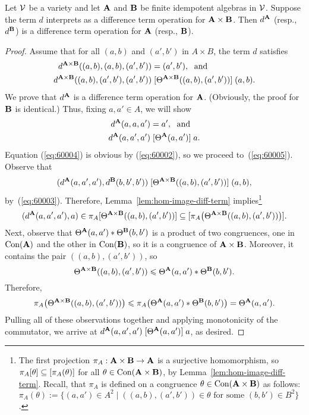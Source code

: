 \begin{lem}
  \label{lem:products}
  Let $\mathcal{V}$ be a variety and let $\mathbf{A}$ and $\mathbf{B}$ be finite idempotent
  algebras in $\mathcal{V}$. Suppose the term $d$ 
  interprets as a difference term operation for $\mathbf{A}\times \mathbf{B}$.
  Then $d^{\mathbf{A}}$ (resp., $d^{\mathbf{B}}$) is a difference term operation for 
  $\mathbf{A}$  (resp., $\mathbf{B}$).
\end{lem}
\begin{proof}
  Assume that for all $(a, b)$ and $(a', b')$ in $A \times B$, the term $d$ satisfies
  \begin{align}
    d^{\bA \times \bB}((a, b), (a, b), (a', b')) &= (a', b'),\; \text{ and } \label{eq:60002}\\
    d^{\bA \times \bB}((a, b), (a', b'), (a', b'))
    &\Comr{\Cg^{\bA \times \bB}((a, b), (a', b'))} (a, b). \label{eq:60003}
  \end{align}
  We prove that $d^{\mathbf{A}}$ is a difference term operation
  for $\mathbf{A}$. (Obviously, the proof for $\mathbf{B}$ is identical.)
  Thus, fixing $a, a' \in A$, we will show 
  \begin{align}
    d^{\bA}(a, a, a') &= a',\; \text{ and } \label{eq:60004}\\
    d^{\bA}(a,a',a')
    &\Comr{\Cg^{\bA}(a, a')} a. \label{eq:60005}
  \end{align}
  Equation (\ref{eq:60004}) is obvious by (\ref{eq:60002}),
  so we proceed to~(\ref{eq:60005}).
  Observe that 
  \[
  (d^{\mathbf{A}}(a, a',a'), d^{\mathbf{B}}(b, b',b'))
  \mathrel{[\Theta^{\mathbf{A} \times \mathbf{B}}((a, b), (a', b'))]} (a, b),
  \]
  by~(\ref{eq:60003}). Therefore, Lemma~\ref{lem:hom-image-diff-term}
  implies\footnote{The first projection 
    $\pi_A : \mathbf{A} \times \mathbf{B} \to \mathbf{A}$ is a surjective 
    homomorphism, so 
  $\pi_A [\theta] \subseteq [\pi_A(\theta)]$
    for all $\theta \in \operatorname{Con} (\mathbf{A} \times \mathbf{B})$,
    by Lemma~\ref{lem:hom-image-diff-term}. Recall, that
    $\pi_A$ is defined on a congruence $\theta \in \operatorname{Con}(\mathbf{A} \times \mathbf{B})$ as follows:
    $\pi_A(\theta) := \{(a,a') \in A^2 \mid ((a,b),(a',b')) \in \theta \text{ for
      some $(b,b')\in B^2$}\}$.}
  \[
    (d^{\mathbf{A}}(a, a',a'), a)\in \pi_A [\Theta^{\mathbf{A} \times \mathbf{B}}((a, b), (a', b'))]
    \subseteq [\pi_A\bigl(\Theta^{\mathbf{A} \times \mathbf{B}}((a, b), (a', b'))\bigr)].
  \]
  Next, observe that 
  $\Theta^{\mathbf{A}}(a,a') \ast \Theta^{\mathbf{B}}(b,b')$  %
  is a product of two congruences, one in $\operatorname{Con}(\mathbf{A})$ and the
  other in $\operatorname{Con}(\mathbf{B})$, so it is a congruence of $\mathbf{A}\times \mathbf{B}$.
  Moreover, it contains the pair $((a,b), (a',b'))$, so
  \[
  \Theta^{\mathbf{A} \times \mathbf{B}}((a, b), (a', b'))\leqslant \Theta^{\mathbf{A}}(a,a') \ast \Theta^{\mathbf{B}}(b,b').
  \]
  Therefore, 
  \[
  \pi_A\bigl(\Theta^{\mathbf{A} \times \mathbf{B}}((a, b), (a', b'))\bigr)
  \leqslant
  \pi_A\bigl(\Theta^{\mathbf{A}}(a,a') \ast \Theta^{\mathbf{B}}(b,b')\bigr) = 
  \Theta^{\mathbf{A}}(a,a').
  \]
  Pulling all of these observations together and applying monotonicity of the
  commutator, we arrive at $d^{\mathbf{A}}(a, a',a')  \mathrel{[\Theta^{\mathbf{A}}(a,a')]} a$, as desired.
\end{proof}

